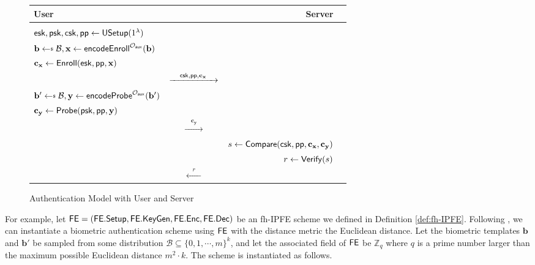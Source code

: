 \begin{figure}[]
	\begin{center}
		\begin{tabular}{l c r c}
			{\bf User} &	& {\bf Server} \\

			\hline

			\\

			${\sf esk}, {\sf psk}, {\sf csk}, {\sf pp} \gets {\sf USetup}(1^\lambda)$ \\

			$ \mathbf{b} \getsdollar \mathcal{B}, \mathbf{x} \gets {\sf encodeEnroll}^{\mathcal{O}_{\sf aux}}(\mathbf{b})$ \\

			$\mathbf{c_x} \gets {\sf Enroll}({\sf esk}, {\sf pp}, \mathbf{x})$ \\

			& $\xrightarrow{\quad {\sf csk}, {\sf pp}, \mathbf{c_x} \quad}$ \\

			$ \mathbf{b'} \getsdollar \mathcal{B}, \mathbf{y} \gets {\sf encodeProbe}^{\mathcal{O}_{\sf aux}}(\mathbf{b'})$ \\

			$\mathbf{c_y} \gets {\sf Probe}({\sf psk}, {\sf pp}, \mathbf{y})$ \\

			& $\xrightarrow{\quad \mathbf{c_y} \quad}$ \\
			
			&  & $s \gets {\sf Compare} ({\sf csk}, {\sf pp}, \mathbf{c_x}, \mathbf{c_y})$ \\

			& & $r \gets {\sf Verify}(s) $ \\

			& $\xleftarrow{\quad r \quad}$ & 
		\end{tabular}
	\end{center}
	\caption{Authentication Model with User and Server}
	\label{table:model}
\end{figure}


For example, let ${\sf FE} = ({\sf FE.Setup}, {\sf FE.KeyGen}, {\sf FE.Enc}, {\sf FE.Dec})$ be an fh-IPFE scheme we defined in Definition \ref{def:fh-IPFE}. Following \cite{cryptoeprint:2023/481}, we can instantiate a biometric authentication scheme using ${\sf FE}$ with the distance metric the Euclidean distance. Let the biometric templates $\mathbf{b}$ and $\mathbf{b'}$ be sampled from some distribution $\mathcal{B} \subseteq \{0,1,\cdots, m\}^k$, and let the associated field of ${\sf FE}$ be $\mathbb{Z}_q$ where $q$ is a prime number larger than the maximum possible Euclidean distance $m^2 \cdot k$. The scheme is instantiated as follows.

